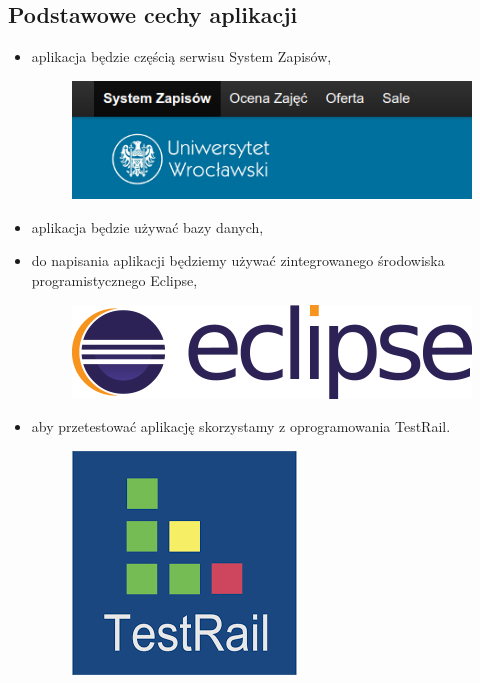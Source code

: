 \documentclass{article}
\begin{document}
\subsection{Podstawowe cechy aplikacji}
\begin{itemize}
 \item aplikacja będzie częścią serwisu System Zapisów,
\begin{figure}[H]
	\begin{center}
		\includegraphics[scale=0.3]{syst.png}
	\end{center}
\end{figure}
 \item aplikacja będzie używać bazy danych,
 \item do napisania aplikacji będziemy używać zintegrowanego środowiska programistycznego Eclipse,
 \begin{figure}[H]
	\begin{center}
		\includegraphics[scale=0.12]{eclipse.png}
	\end{center}
\end{figure}
 \item aby przetestować aplikację skorzystamy z oprogramowania TestRail.
 \begin{figure}[H]
	\begin{center}
		\includegraphics[scale=0.2]{testrail.png}
	\end{center}
\end{figure}
\end{itemize}
\end{document}
